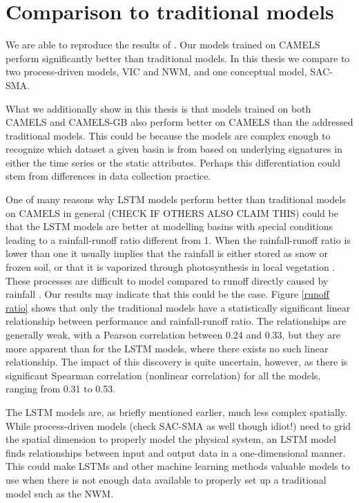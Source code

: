 \section{Comparison to traditional models}
We are able to reproduce the results of \citet{lstm_second_paper,lstm_third_paper}. 
Our models 
trained on CAMELS perform significantly better than traditional models. In this 
thesis we compare to two process-driven models, VIC and NWM, and one conceptual 
model, SAC-SMA. 

What we additionally show in this thesis is that models trained on both CAMELS and CAMELS-GB 
also perform better on CAMELS than the addressed traditional models. This could 
be because the models are complex enough to recognize which dataset a given 
basin is from based on underlying signatures in either the time series or the 
static attributes. Perhaps this differentiation could stem from differences in 
data collection practice. 

One of many reasons why LSTM models perform better than traditional models on CAMELS in general
(CHECK IF OTHERS ALSO CLAIM THIS) \citationneeded could be that the LSTM 
models are better at modelling basins with special conditions leading to 
a rainfall-runoff ratio different from 1. When the rainfall-runoff ratio is lower 
than one it usually implies that the rainfall is either stored as snow or frozen 
soil, or that it is vaporized through photosynthesis in local vegetation \citationneeded. 
These processes are difficult to model compared to runoff directly caused by 
rainfall \citationneeded.
Our results may indicate that this could be the case.
Figure \ref{runoff ratio} shows that only the traditional models have 
a statistically significant linear relationship between performance and 
rainfall-runoff ratio. The relationships are generally weak, with a Pearson 
correlation between 0.24 and 0.33, but they are more apparent than 
for the LSTM models, where there exists no such linear relationship. The impact 
of this discovery is quite uncertain, however, as there is significant 
Spearman correlation (nonlinear correlation) for all the models, ranging 
from 0.31 to 0.53.

The LSTM models are, as briefly mentioned earlier, much less complex spatially. 
While process-driven models (check SAC-SMA as well though idiot!) need to grid the 
spatial dimension to properly model the physical system, an LSTM model finds 
relationships between input and output data in a one-dimensional manner. This could 
make LSTMs and other machine learning methods valuable models to use when there is not 
enough data available to properly set up a traditional model such as the NWM.
